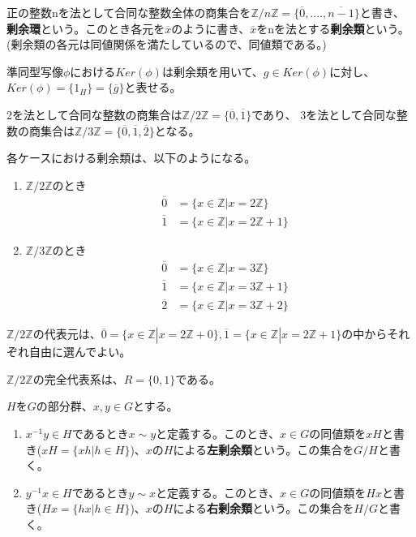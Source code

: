 \documentclass[dvipdfmx,autodetect-engine]{jsarticle}
\begin{document}
\label{defi:IntegerCoset}

正の整数nを法として合同な整数全体の商集合を$\mathbb{Z}/n\mathbb{Z} = \{\overline{0}, ...., \overline{n - 1}\}$と書き、{\bf 剰余環}という。このとき各元を$\overline{x}$のように書き、$\overline{x}$をnを法とする{\bf 剰余類}という。(剰余類の各元は同値関係を満たしているので、同値類である。)

\exam 準同型写像$\phi$における$Ker(\phi)$は剰余類を用いて、$g \in Ker(\phi)$に対し、$Ker(\phi) = \{1_H\} = \{\overline{g}\}$と表せる。

\exam 2を法として合同な整数の商集合は$\mathbb{Z}/2\mathbb{Z} = \{\overline{0}, \overline{1}\}$であり、
3を法として合同な整数の商集合は$\mathbb{Z}/3\mathbb{Z} = \{\overline{0}, \overline{1}, \overline{2}\}$となる。

各ケースにおける剰余類は、以下のようになる。

\begin{enumerate}
\renewcommand{\labelenumi}{(\arabic{enumi})}
\item $\mathbb{Z}/2\mathbb{Z}$のとき
\begin{eqnarray*}
&\overline{0} &= \{x \in \mathbb{Z}|x = 2\mathbb{Z}\} \\
&\overline{1} &= \{x \in \mathbb{Z}|x = 2\mathbb{Z} + 1\}
\end{eqnarray*}

\item $\mathbb{Z}/3\mathbb{Z}$のとき
\begin{eqnarray*}
&\overline{0} &= \{x \in \mathbb{Z}|x = 3\mathbb{Z}\} \\
&\overline{1} &= \{x \in \mathbb{Z}|x = 3\mathbb{Z} + 1\} \\
&\overline{2} &= \{x \in \mathbb{Z}|x = 3\mathbb{Z} + 2\}
\end{eqnarray*}
\end{enumerate}


$\mathbb{Z}/2\mathbb{Z}$の代表元は、$\overline{0} = \{x \in \mathbb{Z}|x = 2\mathbb{Z} + 0\}, \overline{1} = \{x \in \mathbb{Z}|x = 2\mathbb{Z} + 1\}$の中からそれぞれ自由に選んでよい。


$\mathbb{Z}/2\mathbb{Z}$の完全代表系は、$R = \{0, 1\}$である。

 $H$を$G$の部分群、$x, y \in G$とする。

\begin{enumerate}
\renewcommand{\labelenumi}{(\arabic{enumi})}
\item $x^{-1}y \in H$であるとき$x \sim y$と定義する。このとき、$x \in G$の同値類を$xH$と書き($xH = \{xh | h \in H\}$)、$x$の$H$による{\bf 左剰余類}という。この集合を$G/H$と書く。
\item $y^{-1}x \in H$であるとき$y \sim x$と定義する。このとき、$x \in G$の同値類を$Hx$と書き($Hx = \{hx | h \in H\}$)、$x$の$H$による{\bf 右剰余類}という。この集合を$H/G$と書く。
\end{enumerate}
\end{document}
